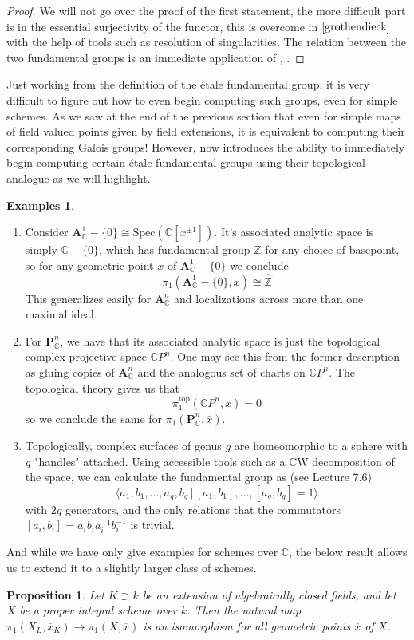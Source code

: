 \documentclass{article}
\theoremstyle{definition}
\newtheorem{examples}[theorem]{Examples}
\theoremstyle{remark}
\theoremstyle{plain}
\newtheorem{proposition}[theorem]{Proposition}
\newcommand{\C}{\mathbb{C}}
\newcommand{\Z}{\mathbb{Z}}
\begin{document}
\begin{proof}
	We will not go over the proof of the first statement, the more difficult part is in the essential surjectivity of the functor, this is overcome in $\cite{grothendieck}$ with the help of tools such as resolution of singularities.
	The relation between the two fundamental groups is an immediate application of , .
\end{proof}

Just working from the definition of the \'etale fundamental group, it is very difficult to figure out how to even begin computing such groups, even for simple schemes. 
As we saw at the end of the previous section that even for simple maps of field valued points given by field extensions, it is equivalent to computing their corresponding Galois groups!
However,  now introduces the ability to immediately begin computing certain \'etale fundamental groups using their topological analogue as we will highlight.

\begin{examples} \text{}
	\begin{enumerate} 	\item Consider $\textbf{A}_{\C}^1 - \{0\} \cong \text{Spec}(\C[x^{\pm 1}])$. 
		It's associated analytic space is simply $\C - \{0\}$, which has fundamental group $\Z$ for any choice of basepoint, so for any geometric point $\overline{x}$ of $\textbf{A}_{\C}^1 - \{0\}$ we conclude
		\[\pi_1(\textbf{A}_{\C}^1 - \{0\}, \overline{x}) \cong \widehat{\Z}\]
		This generalizes easily for $\textbf{A}_{\C}^n$  and localizations across more than one maximal ideal. 
		\item For $\textbf{P}_{\C}^n$, we have that its associated analytic space is just the topological complex projective space $\C P^n$.
	One may see this from the former description as gluing copies of $\textbf{A}_{\C}^n$ and the analogous set of charts on $\C P^n$.
	The topological theory gives us that 
	\[\pi_1^{\text{top}}(\C P^n, x) = 0\]
	so we conclude the same for $\pi_1(\textbf{P}_{\C}^n, \overline{x})$.
\item Topologically, complex surfaces of genus $g$ are homeomorphic to a sphere with $g$ "handles" attached.
	Using accessible tools such as a CW decomposition of the space, we can calculate the fundamental group as (see \cite{FomenkoFuchs} Lecture 7.6)
	\[\langle a_1, b_1, \dots, a_g, b_g \,|\, [a_1,b_1], \dots, [a_g,b_g] = 1\rangle \]
	with $2g$ generators, and the only relations that the commutators $[a_i, b_i] = a_i b_i a_i^{-1} b_i^{-1}$ is trivial.
\end{enumerate}
\end{examples}
And while we have only give examples for schemes over $\C$, the below result allows us to extend it to a slightly larger class of schemes. 
\begin{proposition}
	Let $K \supset k$ be an extension of algebraically closed fields, and let $X$ be a proper integral scheme over $k$.
	Then the natural map $\pi_1(X_L, \overline{x}_K) \to \pi_1(X, \overline{x})$ is an isomorphism for all geometric points $\overline{x}$ of $X$.
\end{proposition} 
\end{document}
